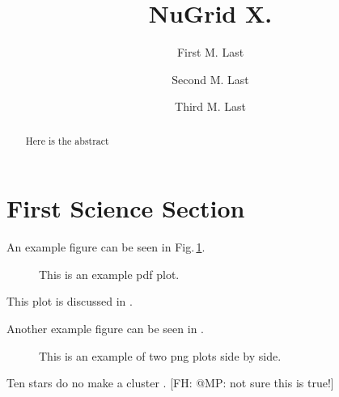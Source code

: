 \documentclass[twocolumn]{aastex61}
\newcommand{\shortcomment}[3]{\textcolor{#1}{[#2: #3]}}
\newcommand{\fhcom}[1]{\shortcomment{PineGreen}{FH}{#1}}
\begin{document}
\title{NuGrid X. }
\author{First M. Last}

\author{Second  M. Last}

\author{Third M. Last}




\begin{abstract}
  Here is the abstract
\end{abstract}

\keywords{}

\section{First Science Section}\label{s.science1} 


An example figure can be seen in Fig.\,\ref{fig:general}.
\begin{figure}[ht!]
\caption{\label{fig:general}
This is an example pdf plot.}
\end{figure}

This plot is discussed in \citet{lau:12}.

Another example figure can be seen in .
\begin{figure}[ht!]
\caption{This is an example of two png plots side by side.
  \label{fig:two-plotexample}}
\end{figure}

Ten stars do no make a cluster \citep{2001A&A...369..574V}.
\fhcom{@MP: not sure this is true!}






\end{document}
